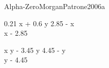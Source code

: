 
\begin{bilevelmodel}{Alpha-Zero}{MorganPatrone2006a}
    \begin{upperlevel}{0.21 x + 0.6 y}{
         2.85 - x  \\ 
 x - 2.85 
    }
    \end{upperlevel}
    \begin{lowerlevel}{x y - 3.45 y}{
         4.45 - y  \\ 
 y - 4.45 
    }
    \end{lowerlevel}
\end{bilevelmodel}
    
        